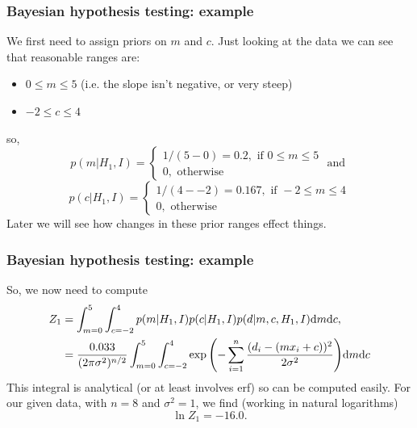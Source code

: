 \begin{frame}

\frametitle{Bayesian hypothesis testing: example}
\label{bayesianhypothesistesting:example}

We first need to assign priors on $m$ and $c$. Just looking at the data we can see that
reasonable ranges are:

\begin{itemize}
\item $0 \le m \le 5$ (i.e. the slope isn't negative, or very steep)

\item $-2 \le c \le 4$

\end{itemize}

so,
\[
p(m|H_1,I) = \begin{cases} 1/(5-0) = 0.2, \text{ if } 0 \le m \le 5 \\ 0, \text{ otherwise}\end{cases}
\text{ and }
\]
\[
p(c|H_1,I) = \begin{cases} 1/(4--2) = 0.167, \text{ if } -2 \le m \le 4 \\ 0, \text{ otherwise}\end{cases}
\]
Later we will see how changes in these prior ranges effect things.

\end{frame}

\begin{frame}

\frametitle{Bayesian hypothesis testing: example}
\label{bayesianhypothesistesting:example}

So, we now need to compute
\begin{align*}
Z_1 &= \int_{m=0}^5 \int_{c=-2}^4 p(m|H_1,I)p(c|H_1,I)p(d|m,c,H_1,I) {\rm d}m{\rm d}c,\\
&= \frac{0.033}{(2\pi \sigma^2)^{n/2}} \int_{m=0}^5 \int_{c=-2}^4 \exp{\left(-\sum_{i=1}^n\frac{(d_i - (mx_i+c))^2}{2\sigma^2} \right)} {\rm d}m{\rm d}c
\end{align*}
This integral is analytical (or at least involves erf) so can be computed easily. For our given data, with
$n=8$ and $\sigma^2 = 1$, we find (working in natural logarithms)
\[
\ln{Z_1} = -16.0. 
\]

\end{frame}

